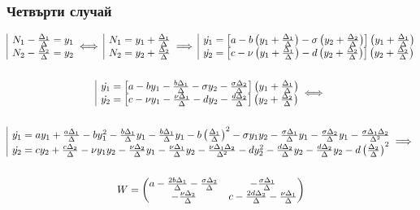 \documentclass[a4paper,fleqn,12pt]{article}
\begin{document}
\subsubsection{Четвърти случай}
\begin{gather*}
	\begin{array}{|l@{}}
		 N_1 - \frac{\Delta_1}{\Delta} = y_1 \\
		 N_2 - \frac{\Delta_2}{\Delta} = y_2
	\end{array} \iff 
	\begin{array}{|l@{}}
		 N_1  = y_1 + \frac{\Delta_1}{\Delta}\\
		 N_2  = y_2 + \frac{\Delta_2}{\Delta}
	\end{array} \implies
	\begin{array}{|l@{}}
		\dot{y_1} = \left[a - b \left(y_1 + \frac{\Delta_1}{\Delta} \right) - \sigma \left(y_2 + \frac{\Delta_2}{\Delta} \right)\right] \left(y_1 + \frac{\Delta_1}{\Delta} \right)\\
		\dot{y_2} = \left[c - \nu \left(y_1 + \frac{\Delta_1}{\Delta} \right) - d \left(y_2 + \frac{\Delta_2}{\Delta} \right) \right] \left(y_2 + \frac{\Delta_2}{\Delta} \right)
	\end{array} \\ \\
\begin{array}{|l@{}}
		\dot{y_1} = \left[a-by_1-\frac{b\Delta_1}{\Delta} - \sigma y_2 - \frac{\sigma\Delta_2}{\Delta} \right] 
					\left(y_1 + \frac{\Delta_1}{\Delta} \right) \\
		\dot{y_2} = \left[c - \nu y_1 - \frac{\nu\Delta_1}{\Delta} -dy_2 - \frac{d\Delta_2}{\Delta}\right] 
					\left(y_2 + \frac{\Delta_2}{\Delta} \right)
	\end{array} \iff \\ \\
	\begin{array}{|l@{}}
		\dot{y_1} =  ay_1 + \frac{a\Delta_1}{\Delta} -by_1 ^2 - \frac{b\Delta_1}{\Delta}y_1 - \frac{b\Delta_1}{\Delta}y_1 
					- b \left( \frac{\Delta_1}{\Delta}\right)^2  - \sigma y_1 y_2 - \frac{\sigma\Delta_1}{\Delta} y_1
					- \frac{\sigma\Delta_2}{\Delta} y_1 - \frac{\sigma\Delta_1\Delta_2}{\Delta^2}\\
		\dot{y_2} = cy_2 + \frac{c\Delta_2}{\Delta} - \nu y_1y_2 -  \frac{\nu\Delta_2}{\Delta}y_1 
					-  \frac{\nu\Delta_1}{\Delta}y_2 - \frac{\nu\Delta_1\Delta_2}{\Delta^2}
					- d y_2 ^2 -  \frac{d\Delta_2}{\Delta}y_2 - \frac{d\Delta_2}{\Delta}y_2 
					- d\left( \frac{\Delta_2}{\Delta}\right)^2 
	\end{array} \implies \\ \\ 
	W = \begin{pmatrix}
 			a -\frac{2b\Delta_1}{\Delta} - \frac{\sigma\Delta_2}{\Delta}& - \frac{\sigma \Delta_1}{\Delta}\\
			- \frac{\nu\Delta_2}{\Delta}& c - \frac{2d \Delta_2}{\Delta} - \frac{\nu\Delta_1}{\Delta}
		 \end{pmatrix}
\end{gather*}
\end{document}
